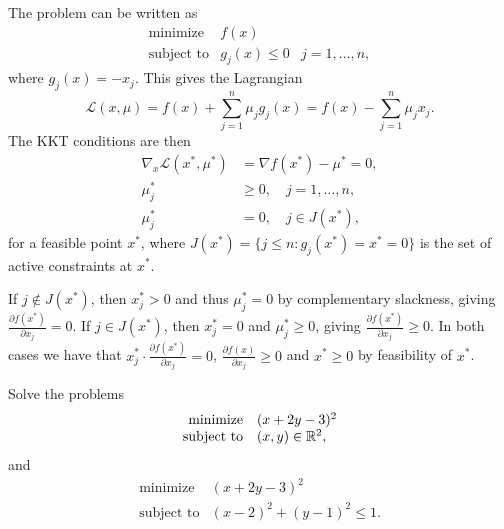 \begin{solution}
  The problem can be written as
  \begin{equation}
    \begin{array}{rll}
      \text{minimize} & f(x) \\
      \text{subject to} & g_j(x) \leq 0 & j = 1, \ldots, n,
    \end{array}
  \end{equation}
  where $g_j(x) = -x_j$.
  This gives the Lagrangian
  \begin{equation}
    \mathcal{L}(x, \mu) = f(x) + \sum_{j=1}^n \mu_j g_j(x) = f(x) - \sum_{j=1}^n \mu_j x_j.
  \end{equation}
  The KKT conditions are then
  \begin{equation}
    \begin{split}
      \nabla_x \mathcal{L}(x^*, \mu^*) &= \nabla f(x^*) - \mu^* = 0, \\
      \mu_j^* &\geq 0, \quad j = 1, \ldots, n, \\
      \mu_j^* &= 0, \quad j \in J(x^*),
    \end{split}
  \end{equation}
  for a feasible point $x^*$, where $J(x^*) = \{ j \leq n : g_j(x^*) = x^* = 0 \}$ is the set of active constraints at $x^*$.

  If $j \notin J(x^*)$, then $x_j^* > 0$ and thus $\mu_j^* = 0$ by complementary slackness, giving $\frac{\partial f(x^*)}{\partial x_j} = 0$.
  If $j \in J(x^*)$, then $x_j^* = 0$ and $\mu_j^* \geq 0$, giving $\frac{\partial f(x^*)}{\partial x_j} \geq 0$.
  In both cases we have that $x_j^* \cdot \frac{\partial f(x^*)}{\partial x_j} = 0$, $\frac{\partial f(x)}{\partial x_j} \geq 0$ and $x^* \geq 0$ by feasibility of $x^*$.
\end{solution}

\begin{exercise}
  Solve the problems
  \begin{equation}
    \begin{array}{rl}
      \text{minimize} & (x + 2y - 3)^2 \\
      \text{subject to} & (x, y) \in \mathbb{R}^2,
    \end{array}
  \end{equation}
  and
  \begin{equation}
    \begin{array}{rl}
      \text{minimize} & (x + 2y - 3)^2 \\
      \text{subject to} & (x - 2)^2 + (y - 1)^2 \leq 1.
    \end{array}
  \end{equation}
\end{exercise}

